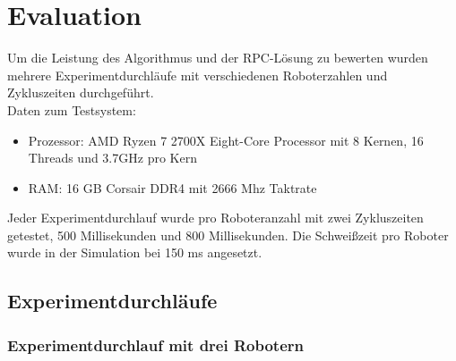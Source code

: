 %
\chapter{Evaluation}

Um die Leistung des Algorithmus und der RPC-Lösung zu bewerten wurden mehrere Experimentdurchläufe mit verschiedenen
Roboterzahlen und Zykluszeiten durchgeführt.\\

Daten zum Testsystem:
\begin{itemize}
 \item Prozessor: AMD Ryzen 7 2700X Eight-Core Processor mit 8 Kernen, 16 Threads und 3.7GHz pro Kern
 \item RAM: 16 GB Corsair DDR4 mit 2666 Mhz Taktrate
\end{itemize}

Jeder Experimentdurchlauf wurde pro Roboteranzahl mit zwei Zykluszeiten getestet, 500 Millisekunden und 800
Millisekunden. Die Schweißzeit pro Roboter wurde in der Simulation bei 150 ms angesetzt.

\clearpage

\section{Experimentdurchläufe}

\subsection{Experimentdurchlauf mit drei Robotern}

